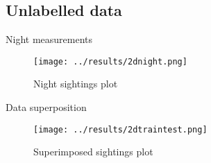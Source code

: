 \subsection{Unlabelled data}

\begin{frame}{Night measurements}
  \begin{figure}[!htbp]
    \centering
    \small{\caption{Night sightings plot}}
    \texttt{[image: ../results/2dnight.png]}
  \end{figure}


\end{frame}

\begin{frame}{Data superposition}
  \begin{figure}[!htbp]
    \centering
    \small{\caption{Superimposed sightings plot}}
    \texttt{[image: ../results/2dtraintest.png]}
  \end{figure}


\end{frame}
